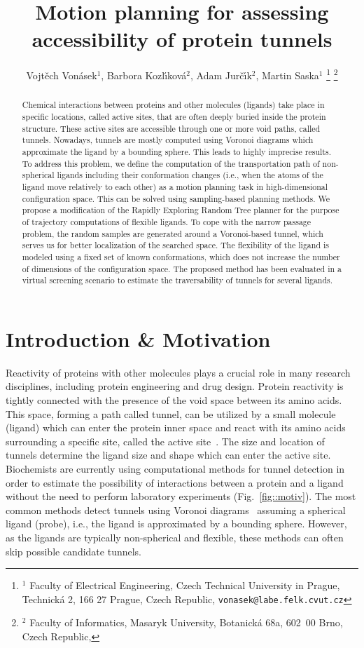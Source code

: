 \documentclass[usletter, 10pt, conference]{ieeeconf} %
\title{Motion planning for assessing accessibility of protein tunnels}
\author{Vojt\v ech Von\' asek$^{1}$,
    Barbora Kozl\'\i kov\'a$^{2}$,
    Adam Jur\v{c}\'\i k$^{2}$,
    Martin Saska$^{1}$
\thanks{$^{1}$ Faculty of Electrical Engineering,  Czech Technical University in Prague, 
Technick\'a 2, 166 27 Prague, Czech Republic,
{\tt vonasek@labe.felk.cvut.cz}}
\thanks{$^{2}$        
Faculty of Informatics,   Masaryk University, Botanick\'a 68a, 602~00 Brno, Czech Republic,
}
}
\begin{document}
\maketitle
\thispagestyle{empty}
\pagestyle{empty}

\begin{abstract}
Chemical interactions between proteins and other molecules (ligands) take place in specific locations, called active sites, that are often deeply buried inside the protein structure.
These active sites are accessible through one or more void paths, called tunnels.
Nowadays, tunnels are mostly computed using Voronoi diagrams which approximate the ligand by a bounding sphere.
This leads to highly imprecise results.
To address this problem, we define the computation of the transportation path of non-spherical ligands including their conformation changes (i.e., when the atoms of the ligand move relatively to each other) as a motion planning task in high-dimensional configuration space.
This can be solved using sampling-based planning methods.
We propose a modification of the Rapidly Exploring Random Tree planner for the purpose of trajectory computations of flexible ligands.
To cope with the narrow passage problem, the random samples are generated around a Voronoi-based tunnel, which serves us for better localization of the searched space.
The flexibility of the ligand is modeled using a fixed set of known conformations, which does not increase the number of dimensions of the configuration space.
The proposed method has been evaluated in a virtual screening scenario to estimate the traversability of tunnels for several ligands.
\end{abstract}


\section{Introduction \& Motivation}


Reactivity of proteins with other molecules plays a crucial role in many research disciplines, including protein engineering and drug design.
Protein reactivity is tightly connected with the presence of the void space between its amino acids. 
This space, forming a path called tunnel, can be utilized by a small molecule (ligand) which can enter the protein inner space and react with its amino acids surrounding a specific site, called the active site~\cite{gora2013gates}.
The size and location of tunnels determine the ligand size and shape which can enter the active site.
Biochemists are currently using computational methods for tunnel detection in order to estimate the possibility of interactions between a protein and a ligand without the need to perform laboratory experiments (Fig.~\ref{fig::motiv}).
The most common methods detect tunnels using Voronoi diagrams~\cite{yaffe2008,caver3} assuming a spherical ligand (probe), i.e., the ligand is approximated by a bounding sphere.
However, as the ligands are typically non-spherical and flexible, these methods can often skip possible candidate tunnels.
\end{document}
